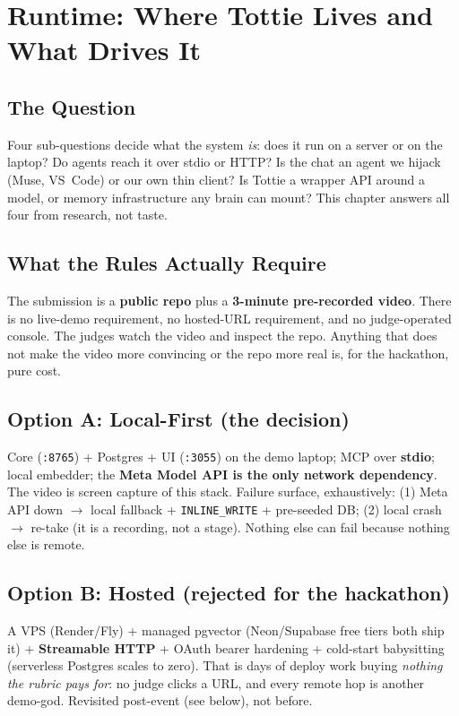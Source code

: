 \chapter{Runtime: Where Tottie Lives and What Drives It}

\section{The Question}
Four sub-questions decide what the system \emph{is}: does it run on a server or on the laptop?
Do agents reach it over stdio or HTTP? Is the chat an agent we hijack (Muse, VS~Code) or our own
thin client? Is Tottie a wrapper API around a model, or memory infrastructure any brain can mount?
This chapter answers all four from research, not taste.

\section{What the Rules Actually Require}
The submission is a \textbf{public repo} plus a \textbf{3-minute pre-recorded video}. There is no
live-demo requirement, no hosted-URL requirement, and no judge-operated console. The judges watch
the video and inspect the repo. Anything that does not make the video more convincing or the repo
more real is, for the hackathon, pure cost.

\section{Option A: Local-First (the decision)}
Core (\texttt{:8765}) + Postgres + UI (\texttt{:3055}) on the demo laptop; MCP over \textbf{stdio};
local embedder; the \textbf{Meta Model API is the only network dependency}. The video is screen
capture of this stack. Failure surface, exhaustively: (1) Meta API down $\rightarrow$ local
fallback + \texttt{INLINE\_WRITE} + pre-seeded DB; (2) local crash $\rightarrow$ re-take (it is a
recording, not a stage). Nothing else can fail because nothing else is remote.

\section{Option B: Hosted (rejected for the hackathon)}
A VPS (Render/Fly) + managed pgvector (Neon/Supabase free tiers both ship it) + \textbf{Streamable
HTTP} + OAuth bearer hardening + cold-start babysitting (serverless Postgres scales to zero).
That is days of deploy work buying \emph{nothing the rubric pays for}: no judge clicks a URL, and
every remote hop is another demo-god. Revisited post-event (see below), not before.

